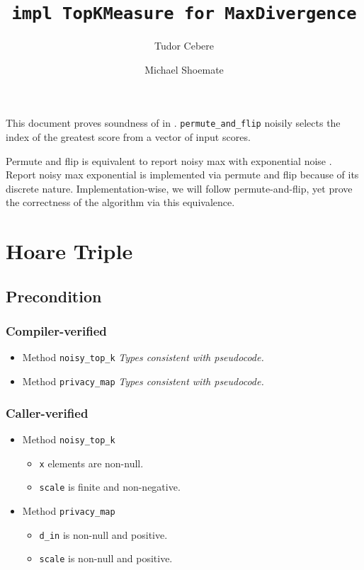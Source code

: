 \documentclass{article}
\title{\texttt{impl TopKMeasure for MaxDivergence}}
\author{Tudor Cebere \and Michael Shoemate}
\begin{document}
\maketitle
\contrib

This document proves soundness of  \cite{mckenna2020permute} in .
\texttt{permute\_and\_flip} noisily selects the index of the greatest score from a vector of input scores.

Permute and flip is equivalent to report noisy max with exponential noise \cite{ding2021permute}.
Report noisy max exponential is implemented via permute and flip because of its discrete nature.
Implementation-wise, we will follow permute-and-flip,
yet prove the correctness of the algorithm via this equivalence.

\section{Hoare Triple}
\subsection*{Precondition}
\subsubsection*{Compiler-verified}
\begin{itemize}
    \item Method \texttt{noisy\_top\_k}
        \textit{Types consistent with pseudocode.}
    \item Method \texttt{privacy\_map}
        \textit{Types consistent with pseudocode.}
\end{itemize}

\subsubsection*{Caller-verified}
\begin{itemize}
    \item Method \texttt{noisy\_top\_k}
        \begin{itemize}
            \item \texttt{x} elements are non-null.
            \item \texttt{scale} is finite and non-negative.
        \end{itemize}
    \item Method \texttt{privacy\_map}
        \begin{itemize}
            \item \texttt{d\_in} is non-null and positive.
            \item \texttt{scale} is non-null and positive.
        \end{itemize}
\end{itemize}
\end{document}

